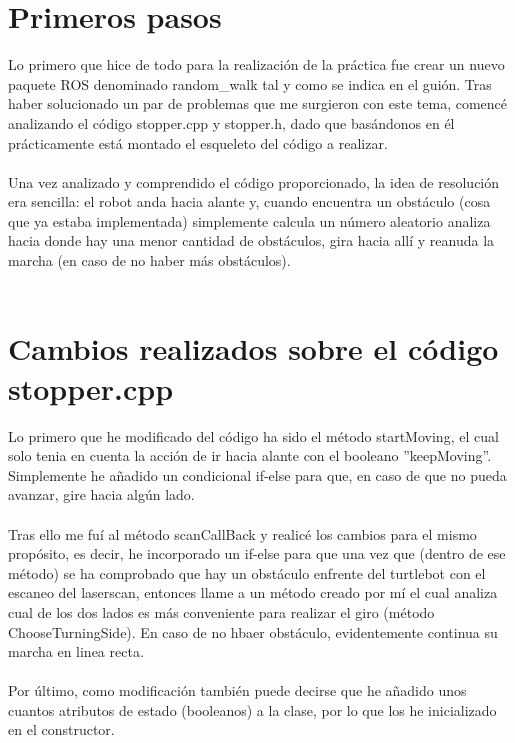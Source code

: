 \newpage %

\tableofcontents %

\newpage



\section{Primeros pasos}

Lo primero que hice de todo para la realización de la práctica fue crear un nuevo paquete ROS denominado random\_walk tal y como se indica en el guión. Tras haber solucionado un par de problemas que me surgieron con este tema, comencé analizando el código stopper.cpp y stopper.h, dado que basándonos en él prácticamente está montado el esqueleto del código a realizar.
\\ \\
Una vez analizado y comprendido el código proporcionado, la idea de resolución era sencilla: el robot anda hacia alante y, cuando encuentra un obstáculo (cosa que ya estaba implementada) simplemente calcula un número aleatorio analiza hacia donde hay una menor cantidad de obstáculos, gira hacia allí y reanuda la marcha (en caso de no haber más obstáculos). \\
\\
\section{Cambios realizados sobre el código stopper.cpp}

Lo primero que he modificado del código ha sido el método startMoving, el cual solo tenia en cuenta la acción de ir hacia alante con el booleano ''keepMoving''. Simplemente he añadido un condicional if-else para que, en caso de que no pueda avanzar, gire hacia algún lado.\\ \\
Tras ello me fuí al método scanCallBack y realicé los cambios para el mismo propósito, es decir, he incorporado un if-else para que una vez que (dentro de ese método) se ha comprobado que hay un obstáculo enfrente del turtlebot con el escaneo del laserscan, entonces llame a un método creado por mí el cual analiza cual de los dos lados es más conveniente para realizar el giro (método ChooseTurningSide). En caso de no hbaer obstáculo, evidentemente continua su marcha en linea recta.\\\\
Por último, como modificación también puede decirse que he añadido unos cuantos atributos de estado (booleanos) a la clase, por lo que los he inicializado en el constructor.

